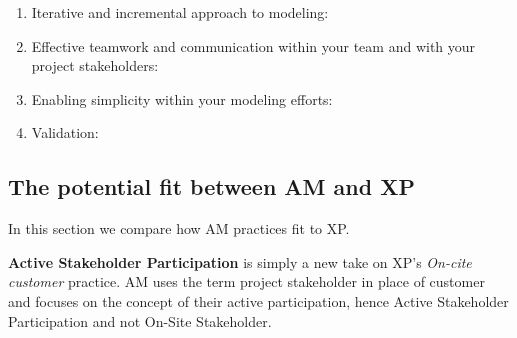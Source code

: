 \begin{enumerate}
  \item Iterative and incremental approach to modeling:
  \item Effective teamwork and communication within your team and with your
  project stakeholders:
  \item Enabling simplicity within your modeling efforts:
  \item Validation:
\end{enumerate}

\subsection{The potential fit between AM and XP}
In this section we compare how AM practices fit to XP.

{\bf Active Stakeholder Participation } is simply a new take on XP's
\emph{On-cite customer} practice. AM uses the term project stakeholder in place
of customer and focuses on the concept of their active participation, hence Active
Stakeholder Participation and not On-Site Stakeholder.

